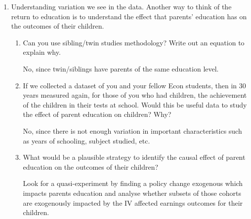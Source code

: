 \documentclass[../Main.tex]{subfiles}
\begin{document}
\begin{refsection}
\begin{enumerate}
\begin{enumerate}
\begin{answer}
        \end{answer}

    \end{enumerate}

    \item Understanding variation we see in the data. Another way to think of
    the return to education is to understand the effect that parents’ education
    has on the outcomes of their children. 

    \begin{enumerate}
    
        \item Can you use sibling/twin studies methodology? Write out an
        equation to explain why.

        \begin{answer} 
            No, since twin/siblings have parents of the same education level.
        \end{answer}
        
        \item If we collected a dataset of you and your fellow Econ students,
        then in 30 years measured again, for those of you who had children, the
        achievement of the children in their tests at school. Would this be
        useful data to study the effect of parent education on children? Why?

        \begin{answer}
        
            No, since there is not enough variation in important characteristics
            such as years of schooling, subject studied, etc.
        
        \end{answer}
        
        \item What would be a plausible strategy to identify the causal effect
        of parent education on the outcomes of their children?

        \begin{answer}
        
            Look for a quasi-experiment by finding a policy change exogenous
            which impacts parents education and analyse whether subsets of those
            cohorts are exogenously impacted by the IV affected earnings
            outcomes for their children.
            
        \end{answer}
        
    \end{enumerate}
    
\end{enumerate}

\printbibliography
\end{refsection}
\end{document}
